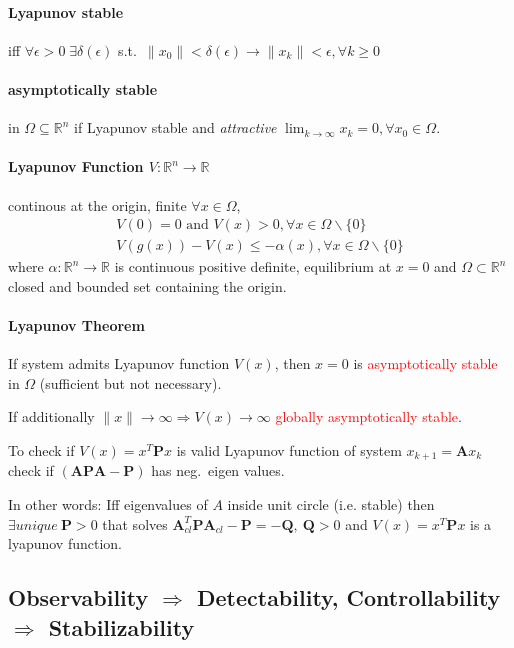 \documentclass[landscape,a4paper,8pt]{scrartcl}
\renewcommand{\implies}{\Rightarrow}
\newcommand{\remph}[1]{{\textcolor{red}{#1}}}
\newcommand{\R}{\mathbb R}
\newcommand\vA{\bm{A}}
\newcommand\vP{\bm{P}}
\newcommand\vQ{\bm{Q}}
\begin{document}
\begin{multicols*}{3}
\paragraph{Lyapunov stable} iff $\forall\epsilon > 0 \; \exists\delta(\epsilon)$ s.t.\
$\lVert x_0 \rVert < \delta(\epsilon)\to \lVert x_k \rVert < \epsilon, \forall k \geq 0$
\paragraph{asymptotically stable} in $\Omega\subseteq \R^n$ if Lyapunov stable and \emph{attractive} $\lim_{k\to\infty}x_k=0, \forall x_0\in \Omega$.

\paragraph{Lyapunov Function $V: \R^n \to \R$}
continous at the origin, finite $\forall x \in \Omega$,
\begin{align*}
V(0) = 0 \text{ and } V(x)>0, \forall x\in \Omega \backslash \{0\}\\
V(g(x))-V(x) \leq -\alpha(x), \forall x\in\Omega\backslash \{0\}
\end{align*}
where $\alpha: \R^n\to\R$ is continuous positive definite, equilibrium at $x=0$
and $\Omega\subset\R^n$ closed and bounded set containing the origin.

\paragraph{Lyapunov Theorem}
If system admits Lyapunov function $V(x)$, then $x=0$ is \remph{asymptotically stable} in $\Omega$ (sufficient but not necessary).

If additionally $\lVert x \rVert \to \infty \implies V(x) \to \infty$ \remph{globally asymptotically stable}.

To check if $V(x) = x^T\vP x$ is valid Lyapunov function of system $x_{k+1} = \vA x_k$ check if $(\vA\vP\vA-\vP)$ has neg.\ eigen values.

In other words: Iff eigenvalues of $A$ inside unit circle (i.e. stable) then $\exists unique \ \vP>0$ that solves $\vA_{cl}^T\vP\vA_{cl}-\vP = -\vQ,\ \vQ > 0$ and $V(x) = x^T\vP x$ is a lyapunov function.

\subsection{Observability $\implies$ Detectability, Controllability $\implies$ Stabilizability}

\end{multicols*}
\end{document}
